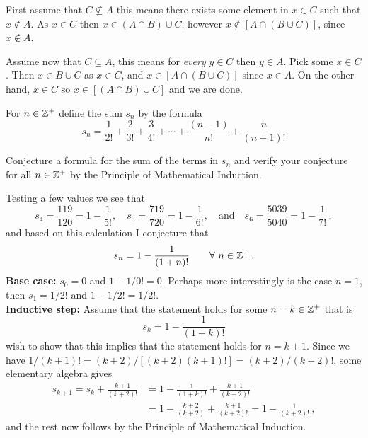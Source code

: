 \documentclass[a4paper, english, 12pt]{article} %
\begin{document}
\begin{answer}
  First assume that $C \not \subseteq A$ this means there exists some element in $x
  \in C$ such that $x \not\in A$. As $x \in C$ then $x \in (A \cap B) \cup C$,
  however $x \not\in [A \cap (B \cup C)]$, since $x \not\in A$.

  Assume now that $C \subseteq A$, this means for \emph{every} $y \in C$ then $y
  \in A$. Pick some $x \in C$. Then $x \in B \cup C$ as $x \in C$, and $x \in [A
  \cap (B \cup C)]$ since $x \in A$. On the other hand, $x \in C$ so $x \in [(A
  \cap B) \cup C]$ and we are done.
\end{answer}




\begin{problem}[6]
  For $n \in \mathbb{Z}^+$ define the sum $s_n$ by the formula
  \begin{equation*}
    s_n = \frac{1}{2!} + \frac{2}{3!} + \frac{3}{4!} + \cdots + \frac{(n-1)}{n!} + \frac{n}{(n+1)!}
  \end{equation*}
  \begin{subproblem}[4]
    Conjecture a formula for the sum of the terms in $s_n$ and verify your
    conjecture for all $n \in \mathbb{Z}^+$ by the Principle of Mathematical Induction.
  \end{subproblem}
\end{problem}

\begin{answer}
  Testing a few values we see that
  \begin{equation*}
    s_4 = \frac{119}{120} = 1 - \frac{1}{5!}, \quad 
    s_5 = \frac{719}{720} = 1 - \frac{1}{6!}, \quad \text{and} \quad
    s_6 = \frac{5039}{5040} = 1 - \frac{1}{7!}\,,
  \end{equation*}
  and based on this calculation I conjecture that
  \begin{equation*}
    s_n = 1 - \frac{1}{(1+n)!} \qquad \forall \ n \in \mathbb{Z}^+\,.
  \end{equation*}
  \textbf{Base case:} $s_0 = 0$ and $1 - 1/0! = 0$. Perhaps more interestingly
  is the case $n=1$, then $s_1 = 1/2!$ and $1 - 1/2! = 1/2!$. \\
  \textbf{Inductive step:} Assume that the statement holds for some $n = k \in
  \mathbb{Z}^+$ that is
  \begin{equation*}
    s_k = 1 - \frac{1}{(1+k)!}
  \end{equation*}
  wish to show that this implies that the statement holds for $n = k + 1$. Since
  we have $1/(k+1)! = (k+2)/[(k+2)(k+1)!] = (k+2)/(k+2)!$, some elementary algebra gives
  \begin{align*}
    s_{k+1}   = s_{k} + \frac{k+1}{(k+2)!} 
             & = 1 - \frac{1}{(1+k)!} + \frac{k+1}{(k+2)!} \\ 
             & = 1 - \frac{k+2}{(k+2)} + \frac{k+1}{(k+2)!}
             = 1 - \frac{1}{(k+2)!}\,,
  \end{align*}
  and the rest now follows by the Principle of Mathematical Induction.
\end{answer}
\end{document}
